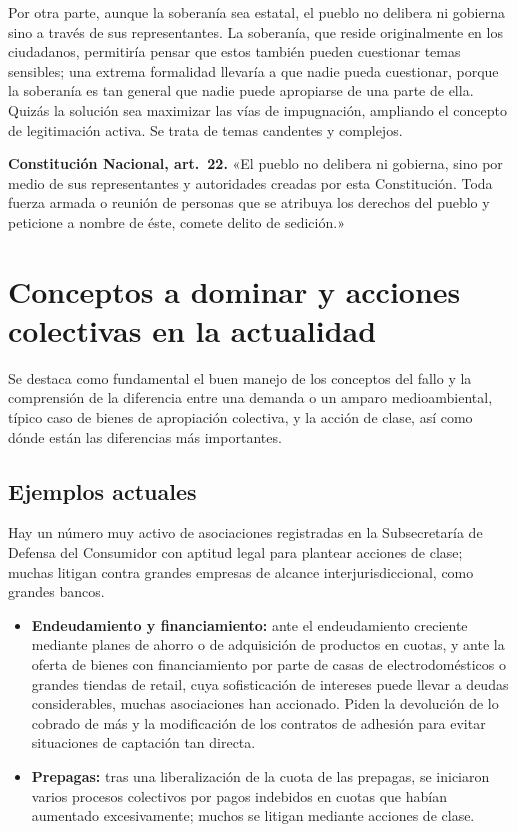 \documentclass[12pt,oneside]{book}
\begin{document}
Por otra parte, aunque la soberanía sea estatal, el pueblo no delibera ni gobierna sino a través de sus representantes. La soberanía, que reside originalmente en los ciudadanos, permitiría pensar que estos también pueden cuestionar temas sensibles; una extrema formalidad llevaría a que nadie pueda cuestionar, porque la soberanía es tan general que nadie puede apropiarse de una parte de ella. Quizás la solución sea maximizar las vías de impugnación, ampliando el concepto de legitimación activa. Se trata de temas candentes y complejos.

\begin{note}
\textbf{Constitución Nacional, art.\ 22.} «El pueblo no delibera ni gobierna, sino por medio de sus representantes y autoridades creadas por esta Constitución. Toda fuerza armada o reunión de personas que se atribuya los derechos del pueblo y peticione a nombre de éste, comete delito de sedición.»
\end{note}

\section{Conceptos a dominar y acciones colectivas en la actualidad}

Se destaca como fundamental el buen manejo de los conceptos del fallo y la comprensión de la diferencia entre una demanda o un amparo medioambiental, típico caso de bienes de apropiación colectiva, y la acción de clase, así como dónde están las diferencias más importantes.

\subsection{Ejemplos actuales}

Hay un número muy activo de asociaciones registradas en la Subsecretaría de Defensa del Consumidor con aptitud legal para plantear acciones de clase; muchas litigan contra grandes empresas de alcance interjurisdiccional, como grandes bancos.

\begin{itemize}
    \item \textbf{Endeudamiento y financiamiento:} ante el endeudamiento creciente mediante planes de ahorro o de adquisición de productos en cuotas, y ante la oferta de bienes con financiamiento por parte de casas de electrodomésticos o grandes tiendas de retail, cuya sofisticación de intereses puede llevar a deudas considerables, muchas asociaciones han accionado. Piden la devolución de lo cobrado de más y la modificación de los contratos de adhesión para evitar situaciones de captación tan directa.
    \item \textbf{Prepagas:} tras una liberalización de la cuota de las prepagas, se iniciaron varios procesos colectivos por pagos indebidos en cuotas que habían aumentado excesivamente; muchos se litigan mediante acciones de clase.
\end{itemize}
\end{document}
